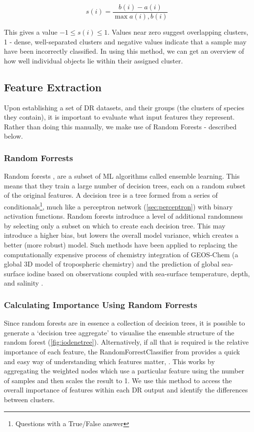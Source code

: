 \begin{equation}
s(i) = \frac{b(i)-a(i)}{\max{ a(i), b(i)}}
\end{equation}

This gives a value $-1 \le s(i) \le 1$. Values near zero suggest overlapping clusters, 1 - dense, well-separated clusters and negative values indicate that a sample may have been incorrectly classified. In using this method, we can get an overview of how well individual objects lie within their assigned cluster.




\subsection{Feature Extraction}\label{sec:drfeature}
Upon establishing a set of DR datasets, and their groups (the clusters of species they contain), it is important to evaluate what input features they represent. Rather than doing this manually, we make use of Random Forests - described below.

\subsubsection{Random Forrests}
Random forests \citep{rfrr}, are a subset of ML algorithms called ensemble learning. This means that they train a large number of decision trees, each on a random subset of the original features. A decision tree is a tree formed from a series of conditionals\footnote{Questions with a True/False answer}, much like a perceptron network (\autoref{sec:perceptron}) with binary activation functions. Random forests introduce a level of additional randomness by selecting only a subset on which to create each decision tree. This may introduce a higher bias, but lowers the overall model variance, which creates a better (more robust) model. Such methods have been applied to replacing the computationally expensive process of chemistry integration of GEOS-Chem (a global 3D model of tropospheric chemistry) \citep{geosrf} and the prediction of global sea-surface iodine based on observations coupled with sea-surface temperature, depth, and salinity \citep{iodene}.

\subsubsection{Calculating Importance Using Random Forrests}
Since random forests are in essence a collection of decision trees, it is possible to generate a `decision tree aggregate' to visualise the ensemble structure of the random forest \citep{forrester} (\autoref{fig:iodenetree}). Alternatively, if all that is required is the relative importance of each feature, the RandomForrestClassifier from \citep{sklearn} provides a quick and easy way of understanding which features matter,
\citep{handsonml}. This works by aggregating the weighted nodes which use a particular feature using the number of samples and then scales the result to 1. We use this method to access the overall importance of features within each DR output and identify the differences between clusters.


